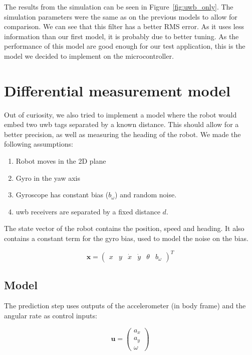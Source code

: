 \documentclass[a4paper, 12pt]{scrreprt}
\begin{document}
The results from the simulation can be seen in Figure~\ref{fig:uwb_only}.
The simulation parameters were the same as on the previous models to allow for comparison.
We can see that this filter has a better RMS error.
As it uses less information than our first model, it is probably due to better tuning.
As the performance of this model are good enough for our test application, this is the model we decided to implement on the microcontroller.

\section{Differential measurement model}

Out of curiosity, we also tried to implement a model where the robot would embed two \gls{uwb} tags separated by a known distance.
This should allow for a better precision, as well as measuring the heading of the robot.
We made the following assumptions:

\begin{enumerate}
    \item Robot moves in the 2D plane
    \item Gyro in the yaw axis
    \item  Gyroscope has constant bias ($b_\omega$) and random noise.
    \item \gls{uwb} receivers are separated by a fixed distance $d$.
\end{enumerate}

The state vector of the robot contains the position, speed and heading.
It also contains a constant term for the gyro bias, used to model the noise on the bias.


\begin{equation}
\mathbf{x} = \begin{pmatrix} x & y & \dot{x} & \dot{y} & \theta & b_{\omega} \end{pmatrix}^T
\end{equation}

\subsection{Model}

The prediction step uses outputs of the accelerometer (in body frame) and the angular rate as control inputs:

\begin{equation}
\mathbf{u} = \begin{pmatrix}
    a_x\\
    a_y\\
    \omega
\end{pmatrix}
\end{equation}
\end{document}
